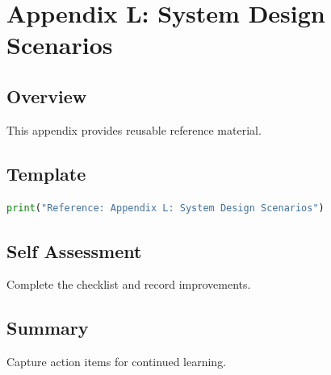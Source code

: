 \chapter{Appendix L: System Design Scenarios}
\label{chap:vol16-2}



\section{Overview}
This appendix provides reusable reference material.

\section{Template}
\begin{lstlisting}[language=Python]
print("Reference: Appendix L: System Design Scenarios")
\end{lstlisting}

\section{Self Assessment}
\begin{exercise}
Complete the checklist and record improvements.
\end{exercise}

\section{Summary}
Capture action items for continued learning.
